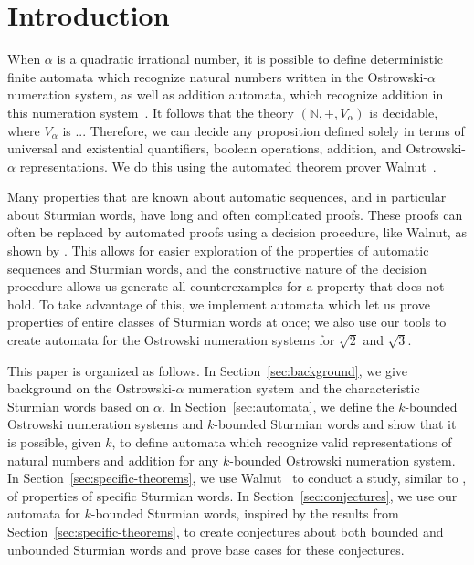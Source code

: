 \section{Introduction}

When $\alpha$ is a quadratic irrational number, it is possible to define deterministic finite automata which recognize natural numbers written in the Ostrowski-$\alpha$ numeration system, as well as addition automata, which recognize addition in this numeration system~\cite{ht-ostrowski}. It follows that the theory $(\mathbb{N}, +, V_{\alpha})$ is decidable, where $V_{\alpha}$ is ... Therefore, we can decide any proposition defined solely in terms of universal and existential quantifiers, boolean operations, addition, and Ostrowski-$\alpha$ representations. We do this using the automated theorem prover Walnut~\cite{walnut}.

Many properties that are known about automatic sequences, and in particular about Sturmian words, have long and often complicated proofs.
These proofs can often be replaced by automated proofs using a decision procedure, like Walnut, as shown by .
This allows for easier exploration of the properties of automatic sequences and Sturmian words, and  the constructive nature of the decision procedure allows us generate all counterexamples for a property that does not hold.
To take advantage of this, we implement automata which let us prove properties of entire classes of Sturmian words at once; we also use our tools to create automata for the Ostrowski numeration systems for $\sqrt{2}$ and $\sqrt{3}$.

This paper is organized as follows.
In Section~\ref{sec:background}, we give background on the Ostrowski-$\alpha$ numeration system and the characteristic Sturmian words based on $\alpha$.
In Section~\ref{sec:automata}, we define the $k$-bounded Ostrowski numeration systems and $k$-bounded Sturmian words and show that it is possible, given $k$, to define automata which recognize valid representations of natural numbers and addition for any $k$-bounded Ostrowski numeration system.
In Section~\ref{sec:specific-theorems}, we use  Walnut~\cite{walnut} to conduct a study, similar to \citeauthor{fibword}, of properties of specific Sturmian words.
In Section~\ref{sec:conjectures}, we use our automata for $k$-bounded Sturmian words, inspired by the results from Section~\ref{sec:specific-theorems}, to create conjectures about both bounded and unbounded Sturmian words and prove base cases for these conjectures.

